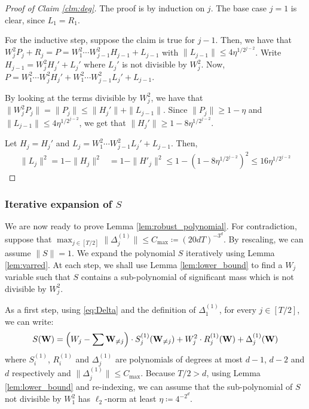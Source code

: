 \begin{proof}[Proof of Claim \ref{clm:deg}]
The proof is by induction on $j$. The base case $j=1$ is clear, since $L_1 = R_1$.

For the inductive step, suppose the claim is true for $j-1$. Then, we have that $W_j^2 P_j + R_j = P = W_1^2 \cdots W_{j-1}^2 H_{j-1} + L_{j-1}$ with $\|L_{j-1}\| \leq 4\eta^{1/2^{j-2}}$. Write $H_{j-1} = W_j^2 H_j' + L_j'$ where $L_j'$ is not divisible by $W_j^2$. Now, $P = W_1^2 \cdots W_j^2 H_j' + W_1^2 \cdots W_{j-1}^2 L_j' + L_{j-1}$.

By looking at the terms divisible by $W_j^2$, we have that $\|W_j^2 P_j\| = \|P_j\| \leq \|H_j'\| + \|L_{j-1}\|$. Since $\|P_j\| \geq 1-\eta$ and $\|L_{j-1}\| \leq 4 \eta^{1/2^{j-2}}$, we get that $\|H_j'\| \geq 1-8\eta^{1/2^{j-2}}$.  

 Let $H_j = H_j'$ and $L_j = W_1^2 \cdots W_{j-1}^2 L_j' + L_{j-1}$. Then, 
\begin{align*}
\|L_j\|^2 = 1-\|H_j\|^2 &= 1-\|H'_j\|^2 \leq 1-(1-8\eta^{1/2^{j-2}})^2 \leq 16 \eta^{1/2^{j-2}}
\end{align*}
\end{proof}
	\subsubsection{Iterative expansion of $S$}
We are now ready to prove Lemma \ref{lem:robust_polynomial}. For contradiction, suppose that $\max_{j \in [T/2]}\|\Delta^{(1)}_j\| \le C_{\max} \coloneqq (20dT)^{-3^d}$. By rescaling, we can assume $\|S\| = 1$. We expand the polynomial $S$ iteratively using Lemma \ref{lem:varred}. At each step, we shall use Lemma \ref{lem:lower_bound} to find a $W_j$ variable such that $S$ contains a sub-polynomial of significant mass which is not divisible by $W_j^2$. 
	
	
	As a first step, using \eqref{eq:Delta} and the definition of $\Delta_1^{(1)}$, for every $j \in [T/2]$, we can write:
\begin{equation}\label{eqn:str}
S(\mathbf{W}) = \left(W_j - \sum \mathbf{W}_{\neq j}\right) \cdot S_j^{(1)}(\mathbf{W}_{\neq j}) + W_j^2 \cdot R_j^{(1)}(\mathbf{W}) + \Delta_j^{(1)}(\mathbf{W})
\end{equation}
where $S_i^{(1)}$, $R_i^{(1)}$ and $\Delta_j^{(1)}$ are polynomials of degrees at most $d-1$, $d-2$ and $d$ respectively and $\|\Delta_j^{(1)}\|\leq C_{\max}$. Because $T/2 > d$, using Lemma \ref{lem:lower_bound} and re-indexing, we can assume that the sub-polynomial of $S$ not divisible by $W_1^2$ has $\ell_2$-norm at least $\eta \coloneqq 4^{-2^d}$. 

